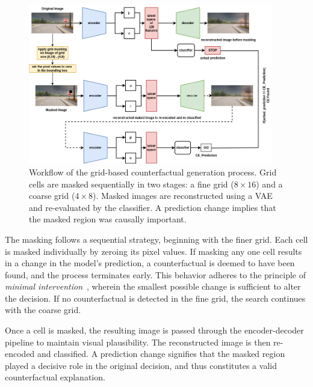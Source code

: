 \begin{figure}[htbp]
\centering
\includegraphics[width=0.95\textwidth]{img/masking/grid_based_masking/grid_based_masking_flow.drawio.png}
\caption{Workflow of the grid-based counterfactual generation process. Grid cells are masked sequentially in two stages: a fine grid ($8 \times 16$) and a coarse grid ($4 \times 8$). Masked images are reconstructed using a VAE and re-evaluated by the classifier. A prediction change implies that the masked region was causally important.}
\label{fig:grid_masking_diagram}
\end{figure}

The masking follows a sequential strategy, beginning with the finer grid. Each cell is masked individually by zeroing its pixel values. If masking any one cell results in a change in the model’s prediction, a counterfactual is deemed to have been found, and the process terminates early. This behavior adheres to the principle of \textit{minimal intervention}~\cite{wachter2018CE}, wherein the smallest possible change is sufficient to alter the decision. If no counterfactual is detected in the fine grid, the search continues with the coarse grid.

Once a cell is masked, the resulting image is passed through the encoder-decoder pipeline to maintain visual plausibility. The reconstructed image is then re-encoded and classified. A prediction change signifies that the masked region played a decisive role in the original decision, and thus constitutes a valid counterfactual explanation.


